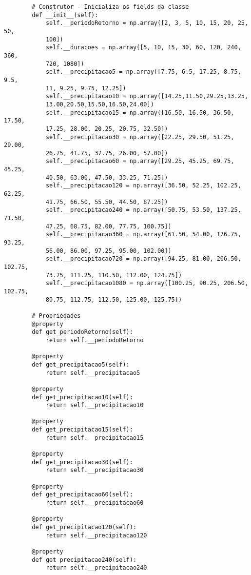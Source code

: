 \begin{apendicesenv}
\begin{verbatim}
        # Construtor - Inicializa os fields da classe
        def __init__(self):
            self.__periodoRetorno = np.array([2, 3, 5, 10, 15, 20, 25, 50, 
            100])
            self.__duracoes = np.array([5, 10, 15, 30, 60, 120, 240, 360, 
            720, 1080])
            self.__precipitacao5 = np.array([7.75, 6.5, 17.25, 8.75, 9.5, 
            11, 9.25, 9.75, 12.25])
            self.__precipitacao10 = np.array([14.25,11.50,29.25,13.25,
            13.00,20.50,15.50,16.50,24.00])
            self.__precipitacao15 = np.array([16.50, 16.50, 36.50, 17.50, 
            17.25, 28.00, 20.25, 20.75, 32.50])
            self.__precipitacao30 = np.array([22.25, 29.50, 51.25, 29.00, 
            26.75, 41.75, 37.75, 26.00, 57.00])
            self.__precipitacao60 = np.array([29.25, 45.25, 69.75, 45.25, 
            40.50, 63.00, 47.50, 33.25, 71.25])
            self.__precipitacao120 = np.array([36.50, 52.25, 102.25, 62.25, 
            41.75, 66.50, 55.50, 44.50, 87.25])
            self.__precipitacao240 = np.array([50.75, 53.50, 137.25, 71.50, 
            47.25, 68.75, 82.00, 77.75, 100.75])
            self.__precipitacao360 = np.array([61.50, 54.00, 176.75, 93.25, 
            56.00, 86.00, 97.25, 95.00, 102.00])
            self.__precipitacao720 = np.array([94.25, 81.00, 206.50, 102.75, 
            73.75, 111.25, 110.50, 112.00, 124.75])
            self.__precipitacao1080 = np.array([100.25, 90.25, 206.50, 102.75, 
            80.75, 112.75, 112.50, 125.00, 125.75])
        
        # Propriedades
        @property
        def get_periodoRetorno(self):
            return self.__periodoRetorno
    
        @property
        def get_precipitacao5(self):
            return self.__precipitacao5
    
        @property
        def get_precipitacao10(self):
            return self.__precipitacao10
    
        @property
        def get_precipitacao15(self):
            return self.__precipitacao15
        
        @property
        def get_precipitacao30(self):
            return self.__precipitacao30
    
        @property
        def get_precipitacao60(self):
            return self.__precipitacao60
    
        @property
        def get_precipitacao120(self):
            return self.__precipitacao120
        
        @property
        def get_precipitacao240(self):
            return self.__precipitacao240
    

\end{verbatim}
\end{apendicesenv}
